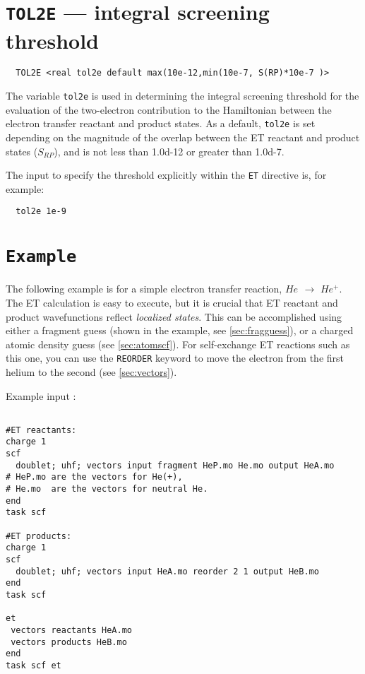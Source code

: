 \section{{\tt TOL2E} --- integral screening threshold}
\label{sec:etranstol2e}

\begin{verbatim}
  TOL2E <real tol2e default max(10e-12,min(10e-7, S(RP)*10e-7 )> 
\end{verbatim}

The variable \verb+tol2e+ is used in determining the integral
screening threshold for the evaluation of the two-electron contribution to the Hamiltonian
between the electron transfer reactant and product states.
As a default, \verb+tol2e+ is set depending on the magnitude
of the overlap between the ET reactant and product states ($S_{RP}$), and is not less than 1.0d-12 
or greater than 1.0d-7.

The input to specify the threshold explicitly within the \verb+ET+
directive is, for example:

\begin{verbatim}
  tol2e 1e-9
\end{verbatim}

\section{{\tt Example}}

The following example is for a simple electron transfer reaction, $He_{}$ $\rightarrow$ $He^{ +}$.
The ET calculation is easy to execute, but it is crucial that ET reactant and product
wavefunctions reflect {\em localized states}. This can be accomplished
using either a fragment guess (shown in the example, see \ref{sec:fragguess}), or a charged atomic
density guess (see \ref{sec:atomscf}). 
For self-exchange ET reactions such as this one, you can use the 
\verb+REORDER+ keyword to move the electron from the first helium to the second (see \ref{sec:vectors}).

Example input :
\begin{verbatim}

#ET reactants:
charge 1
scf 
  doublet; uhf; vectors input fragment HeP.mo He.mo output HeA.mo
# HeP.mo are the vectors for He(+), 
# He.mo  are the vectors for neutral He.
end 
task scf

#ET products:
charge 1
scf 
  doublet; uhf; vectors input HeA.mo reorder 2 1 output HeB.mo
end 
task scf

et
 vectors reactants HeA.mo 
 vectors products HeB.mo
end
task scf et       

\end{verbatim}

